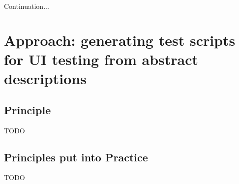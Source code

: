 \documentclass{chi-ext}
\begin{document}
Continuation...

\section{Approach: generating test scripts for UI testing from abstract descriptions}
\subsection{Principle}
TODO

\subsection{Principles put into Practice}
TODO
\end{document}
